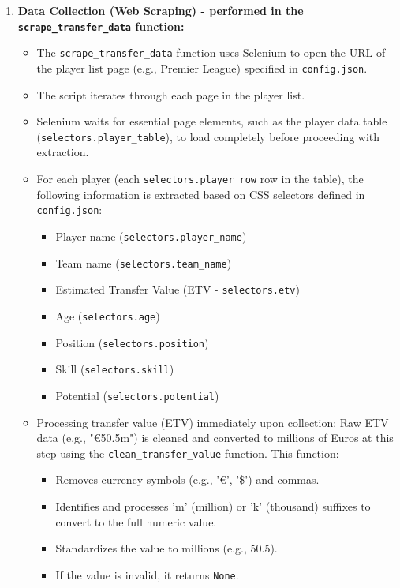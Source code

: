 \documentclass[12pt, a4paper]{report}
\begin{document}
\begin{enumerate}[label=\textbf{Step \arabic*:}, leftmargin=* , itemsep=1ex]
    \item \textbf{Data Collection (Web Scraping) - performed in the \texttt{scrape\_transfer\_data} function:}
    \begin{itemize}[leftmargin=0em]
        \item The \texttt{scrape\_transfer\_data} function uses Selenium to open the URL of the player list page (e.g., Premier League) specified in \texttt{config.json}.
        \item The script iterates through each page in the player list.
        \item Selenium waits for essential page elements, such as the player data table (\texttt{selectors.player\_table}), to load completely before proceeding with extraction.
        \item For each player (each \texttt{selectors.player\_row} row in the table), the following information is extracted based on CSS selectors defined in \texttt{config.json}:
        \begin{itemize}
            \item Player name (\texttt{selectors.player\_name})
            \item Team name (\texttt{selectors.team\_name})
            \item Estimated Transfer Value (ETV - \texttt{selectors.etv})
            \item Age (\texttt{selectors.age})
            \item Position (\texttt{selectors.position})
            \item Skill (\texttt{selectors.skill})
            \item Potential (\texttt{selectors.potential})
        \end{itemize}
        \item Processing transfer value (ETV) immediately upon collection: Raw ETV data (e.g., "€50.5m") is cleaned and converted to millions of Euros at this step using the \texttt{clean\_transfer\_value} function. This function:
        \begin{itemize}
            \item Removes currency symbols (e.g., '€', '\$') and commas.
            \item Identifies and processes 'm' (million) or 'k' (thousand) suffixes to convert to the full numeric value.
            \item Standardizes the value to millions (e.g., 50.5).
            \item If the value is invalid, it returns \texttt{None}.

\end{itemize}
\end{itemize}
\end{enumerate}
\end{document}
